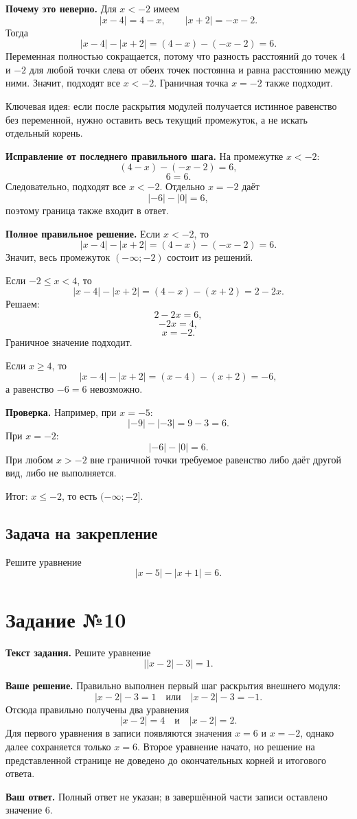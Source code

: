 \documentclass[12pt,a4paper]{article}
\newcommand{\idea}{\textcolor{blue!60!black}{Ключевая идея:}}
\newcommand{\result}{\textcolor{teal!60!black}{Итог:}}
\newcommand{\tasktitle}[1]{\phantomsection\label{task:#1}\section*{Задание №#1}}
\begin{document}
\textbf{Почему это неверно.} Для $x<-2$ имеем
\[
|x-4|=4-x,
\qquad
|x+2|=-x-2.
\]
Тогда
\[
|x-4|-|x+2|=(4-x)-(-x-2)=6.
\]
Переменная полностью сокращается, потому что разность расстояний до точек $4$ и $-2$ для любой точки слева от обеих точек постоянна и равна расстоянию между ними. Значит, подходят все $x<-2$. Граничная точка $x=-2$ также подходит.

\idea{} если после раскрытия модулей получается истинное равенство без переменной, нужно оставить весь текущий промежуток, а не искать отдельный корень.

\textbf{Исправление от последнего правильного шага.} На промежутке $x<-2$:
\[
(4-x)-(-x-2)=6,
\]
\[
6=6.
\]
Следовательно, подходят все $x<-2$. Отдельно $x=-2$ даёт
\[
|-6|-|0|=6,
\]
поэтому граница также входит в ответ.

\textbf{Полное правильное решение.} Если $x<-2$, то
\[
|x-4|-|x+2|=(4-x)-(-x-2)=6.
\]
Значит, весь промежуток $(-\infty;-2)$ состоит из решений.

Если $-2\le x<4$, то
\[
|x-4|-|x+2|=(4-x)-(x+2)=2-2x.
\]
Решаем:
\[
2-2x=6,
\]
\[
-2x=4,
\]
\[
x=-2.
\]
Граничное значение подходит.

Если $x\ge4$, то
\[
|x-4|-|x+2|=(x-4)-(x+2)=-6,
\]
а равенство $-6=6$ невозможно.

\textbf{Проверка.} Например, при $x=-5$:
\[
|-9|-|-3|=9-3=6.
\]
При $x=-2$:
\[
|-6|-|0|=6.
\]
При любом $x>-2$ вне граничной точки требуемое равенство либо даёт другой вид, либо не выполняется.

\result{} $x\le-2$, то есть $(-\infty;-2]$.

\subsection*{Задача на закрепление}
Решите уравнение
\[
|x-5|-|x+1|=6.
\]

\newpage
\tasktitle{10}
\textbf{Текст задания.} Решите уравнение
\[
\bigl||x-2|-3\bigr|=1.
\]

\textbf{Ваше решение.} Правильно выполнен первый шаг раскрытия внешнего модуля:
\[
|x-2|-3=1
\quad\text{или}\quad
|x-2|-3=-1.
\]
Отсюда правильно получены два уравнения
\[
|x-2|=4
\quad\text{и}\quad
|x-2|=2.
\]
Для первого уравнения в записи появляются значения $x=6$ и $x=-2$, однако далее сохраняется только $x=6$. Второе уравнение начато, но решение на представленной странице не доведено до окончательных корней и итогового ответа.

\textbf{Ваш ответ.} Полный ответ не указан; в завершённой части записи оставлено значение $6$.
\end{document}
